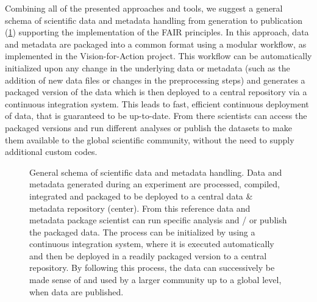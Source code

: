 Combining all of the presented approaches and tools, we suggest a general schema of scientific data and metadata handling from generation to publication (\cref{fig:disc_general_schema}) supporting the implementation of the FAIR principles. In this approach, data and metadata are packaged into a common format using a modular workflow, as implemented in the Vision-for-Action project. This workflow can be automatically initialized upon any change in the underlying data or metadata (such as the addition of new data files or changes in the preprocessing steps) and generates a packaged version of the data which is then deployed to a central repository via a continuous integration system. This leads to fast, efficient continuous deployment of data, that is guaranteed to be up-to-date. From there scientists can access the packaged versions and run different analyses or publish the datasets to make them available to the global scientific community, without the need to supply additional custom codes.

\begin{figure}
 
 \caption[General schema of scientific data and metadata handling]{General schema of scientific data and metadata handling. Data and metadata generated during an experiment are processed, compiled, integrated and packaged to be deployed to a central data \& metadata repository (center). From this reference data and metadata package scientist can run specific analysis and / or publish the packaged data. The process can be initialized by using a continuous integration system, where it is executed automatically and then be deployed in a readily packaged version to a central repository. By following this process, the data can successively be made sense of and used by a larger community up to a global level, when data are published.}
 \label{fig:disc_general_schema}
\end{figure}

